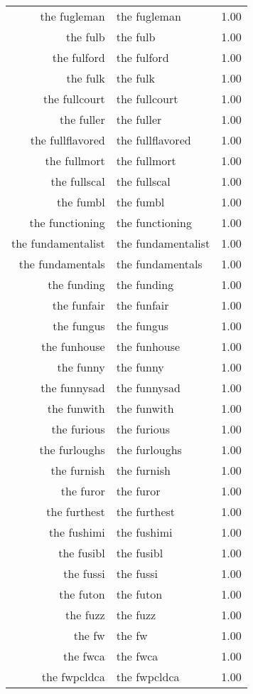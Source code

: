 \begin{table}[ht]
\begin{tabular}{rlr}
  the fugleman & the fugleman & 1.00 \\ 
  the fulb & the fulb & 1.00 \\ 
  the fulford & the fulford & 1.00 \\ 
  the fulk & the fulk & 1.00 \\ 
  the fullcourt & the fullcourt & 1.00 \\ 
  the fuller & the fuller & 1.00 \\ 
  the fullflavored & the fullflavored & 1.00 \\ 
  the fullmort & the fullmort & 1.00 \\ 
  the fullscal & the fullscal & 1.00 \\ 
  the fumbl & the fumbl & 1.00 \\ 
  the functioning & the functioning & 1.00 \\ 
  the fundamentalist & the fundamentalist & 1.00 \\ 
  the fundamentals & the fundamentals & 1.00 \\ 
  the funding & the funding & 1.00 \\ 
  the funfair & the funfair & 1.00 \\ 
  the fungus & the fungus & 1.00 \\ 
  the funhouse & the funhouse & 1.00 \\ 
  the funny & the funny & 1.00 \\ 
  the funnysad & the funnysad & 1.00 \\ 
  the funwith & the funwith & 1.00 \\ 
  the furious & the furious & 1.00 \\ 
  the furloughs & the furloughs & 1.00 \\ 
  the furnish & the furnish & 1.00 \\ 
  the furor & the furor & 1.00 \\ 
  the furthest & the furthest & 1.00 \\ 
  the fushimi & the fushimi & 1.00 \\ 
  the fusibl & the fusibl & 1.00 \\ 
  the fussi & the fussi & 1.00 \\ 
  the futon & the futon & 1.00 \\ 
  the fuzz & the fuzz & 1.00 \\ 
  the fw & the fw & 1.00 \\ 
  the fwca & the fwca & 1.00 \\ 
  the fwpcldca & the fwpcldca & 1.00 \\ 

\end{tabular}
\end{table}
